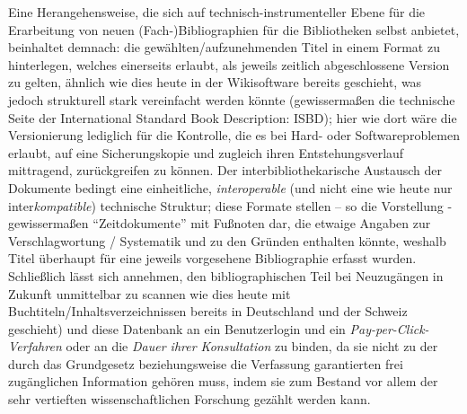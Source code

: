 \documentclass[a4paper,
fontsize=11pt,
oneside,
numbers=noperiodatend,
parskip=half-,
bibliography=totoc,
final
]{scrartcl}
\begin{document}
Eine Herangehensweise, die sich auf technisch-instrumenteller Ebene für
die Erarbeitung von neuen (Fach-)Bibliographien für die Bibliotheken
selbst anbietet, beinhaltet demnach: die gewählten/aufzunehmenden Titel
in einem Format zu hinterlegen, welches einerseits erlaubt, als jeweils
zeitlich abgeschlossene Version zu gelten, ähnlich wie dies heute in der
Wikisoftware bereits geschieht, was jedoch strukturell stark vereinfacht
werden könnte (gewissermaßen die technische Seite der International
Standard Book Description: ISBD); hier wie dort wäre die Versionierung
lediglich für die Kontrolle, die es bei Hard- oder Softwareproblemen
erlaubt, auf eine Sicherungskopie und zugleich ihren Entstehungsverlauf
mittragend, zurückgreifen zu können. Der interbibliothekarische
Austausch der Dokumente bedingt eine einheitliche, \emph{interoperable}
(und nicht eine wie heute nur inter\emph{kompatible}) technische
Struktur; diese Formate stellen -- so die Vorstellung - gewissermaßen
\enquote{Zeitdokumente} mit Fußnoten dar, die etwaige Angaben zur
Verschlagwortung / Systematik und zu den Gründen enthalten könnte,
weshalb Titel überhaupt für eine jeweils vorgesehene Bibliographie
erfasst wurden. Schließlich lässt sich annehmen, den bibliographischen
Teil bei Neuzugängen in Zukunft unmittelbar zu scannen wie dies heute
mit Buchtiteln/Inhaltsverzeichnissen bereits in Deutschland und der
Schweiz geschieht) und diese Datenbank an ein Benutzerlogin und ein
\emph{Pay-per-Click-Verfahren} oder an die \emph{Dauer ihrer
Konsultation} zu binden, da sie nicht zu der durch das Grundgesetz
beziehungsweise die Verfassung garantierten frei zugänglichen
Information gehören muss, indem sie zum Bestand vor allem der sehr
vertieften wissenschaftlichen Forschung gezählt werden kann.
\end{document}
